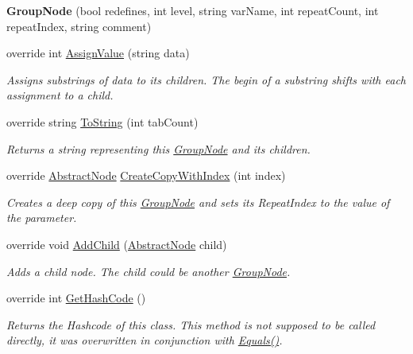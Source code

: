 \begin{DoxyCompactItemize}
\item 
{\bfseries Group\+Node} (bool redefines, int level, string var\+Name, int repeat\+Count, int repeat\+Index, string comment)\hypertarget{class__1920_parser_1_1_group_node_a53519a72e3f5194de29b77e51f5df939}{}\label{class__1920_parser_1_1_group_node_a53519a72e3f5194de29b77e51f5df939}

\item 
override int \hyperlink{class__1920_parser_1_1_group_node_a27b61720154a26499149966cf22de811}{Assign\+Value} (string data)
\begin{DoxyCompactList}\small\item\em Assigns substrings of data to its children. The begin of a substring shifts with each assignment to a child. \end{DoxyCompactList}\item 
override string \hyperlink{class__1920_parser_1_1_group_node_a9d5c05eabdd12c9c4ca306cc369d8523}{To\+String} (int tab\+Count)
\begin{DoxyCompactList}\small\item\em Returns a string representing this \hyperlink{class__1920_parser_1_1_group_node}{Group\+Node} and its children. \end{DoxyCompactList}\item 
override \hyperlink{class__1920_parser_1_1_abstract_node}{Abstract\+Node} \hyperlink{class__1920_parser_1_1_group_node_ab01b00a2bbbef1d565e5ef3e951c4ed6}{Create\+Copy\+With\+Index} (int index)
\begin{DoxyCompactList}\small\item\em Creates a deep copy of this \hyperlink{class__1920_parser_1_1_group_node}{Group\+Node} and sets its Repeat\+Index to the value of the parameter. \end{DoxyCompactList}\item 
override void \hyperlink{class__1920_parser_1_1_group_node_a037839ecea0ec7326c6a49e0793bd6c8}{Add\+Child} (\hyperlink{class__1920_parser_1_1_abstract_node}{Abstract\+Node} child)
\begin{DoxyCompactList}\small\item\em Adds a child node. The child could be another \hyperlink{class__1920_parser_1_1_group_node}{Group\+Node}. \end{DoxyCompactList}\item 
override int \hyperlink{class__1920_parser_1_1_group_node_a314c8fb4d4f71b11916df9c822b9442d}{Get\+Hash\+Code} ()
\begin{DoxyCompactList}\small\item\em Returns the Hashcode of this class. This method is not supposed to be called directly, it was overwritten in conjunction with \hyperlink{class__1920_parser_1_1_group_node_a944b36a0063df009c7f554522f7e38fc}{Equals()}. \end{DoxyCompactList}\item 

\end{DoxyCompactItemize}
